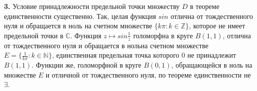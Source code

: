 \documentclass[16pt, letterpaper]{article}
\begin{document}
\vspace{5mm}

\textbf{3.} Условие принадлежности предельной точки множеству $D$ в теореме единственности существенно. Так, целая функция $sin$ отлична от тождественного нуля и обращается в ноль на счетном множестве $\{k\pi : k \in \mathbb{Z}\}$, которое не имеет предельной точки в $\mathbb{C}$. Функция $z \mapsto sin \frac{1}{z}$ голоморфна в круге $B(1, 1)$, отлична от тождественного нуля и обращается в нольна счетном множестве $E = \{\frac{1}{k\pi} : k \in \mathbb{N}\}$, единственная предельная точка которого $0$ не принадлежит $B(1, 1)$. Функции же, голоморфной в круге $B(0, 1)$, обращающейся в ноль на множестве $E$ и отличной от тождественного нуля, по теореме единственности не $\exists$.
\end{document}
